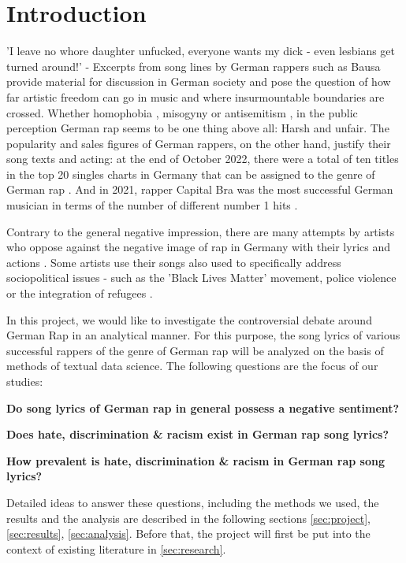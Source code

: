 \section{Introduction}\label{sec:motivation}
'I leave no whore daughter unfucked, everyone wants my dick - even lesbians get turned around!' - Excerpts from song lines by German rappers such as Bausa \cite{steffes-lay_2019} provide material for discussion in German society and pose the question of how far artistic freedom can go in music and where insurmountable boundaries are crossed. Whether homophobia \cite{steffes-lay_2019}, misogyny \cite{steffes-lay_2019} or antisemitism \cite{salomo_greven_2021}, in the public perception German rap seems to be one thing above all: Harsh and unfair. The popularity and sales figures of German rappers, on the other hand, justify their song texts and acting: at the end of October 2022, there were a total of ten titles in the top 20 singles charts in Germany that can be assigned to the genre of German rap \cite{mtv_germany_2022}. And in 2021, rapper Capital Bra was the most successful German musician in terms of the number of different number 1 hits \cite{br_2019}. 

Contrary to the general negative impression, there are many attempts by artists who oppose against the negative image of rap in Germany with their lyrics and actions \cite{Deutschlandfunk_2021}. Some artists use their songs also used to specifically address sociopolitical issues - such as the 'Black Lives Matter' movement, police violence or the integration of refugees \cite{me-redaktion_2021}.

In this project, we would like to investigate the controversial debate around German Rap in an analytical manner. For this purpose, the song lyrics of various successful rappers of the genre of German rap will be analyzed on the basis of methods of textual data science. The following questions are the focus of our studies:

\begin{questions}
    \item \textbf{Do song lyrics of German rap in general possess a negative sentiment?}
    \item \textbf{Does hate, discrimination \& racism exist in German rap song lyrics?}
    \item \textbf{How prevalent is hate, discrimination \& racism in German rap song lyrics?}
\end{questions}

Detailed ideas to answer these questions, including the methods we used, the results and the analysis are described in the following sections \ref{sec:project}, \ref{sec:results}, \ref{sec:analysis}. Before that, the project will first be put into the context of existing literature in \autoref{sec:research}.










